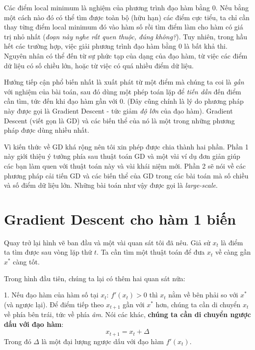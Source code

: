 Các điểm local minimum là nghiệm của phương trình đạo hàm bằng 0. Nếu bằng một cách nào đó có thể tìm được toàn bộ (hữu hạn) các điểm cực tiểu, ta chỉ cần thay từng điểm local minimum đó vào hàm số rồi tìm điểm làm cho hàm có giá trị nhỏ nhất (\textit{đoạn này nghe rất quen thuộc, đúng không?}). Tuy nhiên, trong hầu hết các trường hợp, việc giải phương trình đạo hàm bằng 0 là bất khả thi. Nguyên nhân có thể đến từ sự phức tạp của dạng của đạo hàm, từ việc các điểm dữ liệu có số chiều lớn, hoặc từ việc có quá nhiều điểm dữ liệu.  
 
Hướng tiếp cận phổ biến nhất là xuất phát từ một điểm mà chúng ta coi là \textit{gần} với nghiệm của bài toán, sau đó dùng một phép toán lặp để \textit{tiến dần} đến điểm cần tìm, tức đến khi đạo hàm gần với 0. (Đây cũng chính là lý do phương pháp này được gọi là Gradient Descent - tức giảm \textit{độ lớn} của đạo hàm). Gradient Descent (viết gọn là GD) và các biến thể của nó là một trong những phương pháp được dùng nhiều nhất.  
 
Vì kiến thức về GD khá rộng nên tôi xin phép được chia thành hai phần. Phần 1 này giới thiệu ý tưởng phía sau thuật toán GD và một vài ví dụ đơn giản giúp các bạn làm quen với thuật toán này và vài khái niệm mới. Phần 2 sẽ nói về các phương pháp cải tiến GD và các biến thể của GD trong các bài toán mà số chiều và số điểm dữ liệu lớn. Những bài toán như vậy được gọi là \textit{large-scale}.  
 
 
 
\section{Gradient Descent cho hàm 1 biến}
Quay trở lại hình vẽ ban đầu và một vài quan sát tôi đã nêu. Giả sử  $x_t$ là điểm ta tìm được sau vòng lặp thứ $t$. Ta cần tìm một thuật toán để đưa $x_t$ về càng gần $x^*$ càng tốt.  
 
Trong hình đầu tiên, chúng ta lại có thêm hai quan sát nữa: 
 
1. Nếu đạo hàm của hàm số tại $x_t$: $f'(x_t) > 0$ thì $x_t$ nằm về bên phải so với $x^*$ (và ngược lại). Để điểm tiếp theo $x_{t+1}$ gần với $x^*$ hơn, chúng ta cần di chuyển $x_t$ về phía bên trái, tức về phía \textit{âm}. Nói các khác, \textbf{chúng ta cần di chuyển ngược dấu với đạo hàm}: 
\begin{equation*} 
x_{t+1} = x_t + \Delta 
\end{equation*} 
Trong đó $\Delta$ là một đại lượng ngược dấu với đạo hàm $f'(x_t)$. 
 
